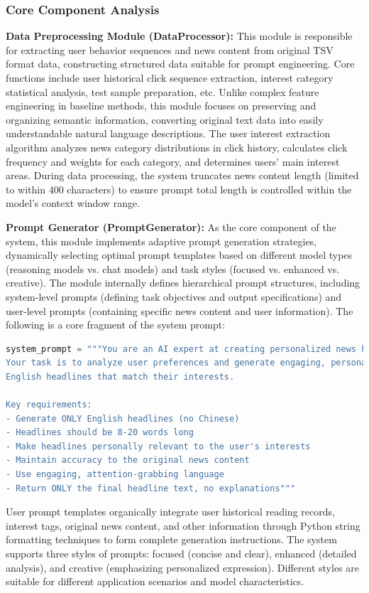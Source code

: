 \documentclass[10pt,a4paper]{article}
\begin{document}
\subsubsection{Core Component Analysis}
\textbf{Data Preprocessing Module (DataProcessor):} This module is responsible for extracting user behavior sequences and news content from original TSV format data, constructing structured data suitable for prompt engineering. Core functions include user historical click sequence extraction, interest category statistical analysis, test sample preparation, etc. Unlike complex feature engineering in baseline methods, this module focuses on preserving and organizing semantic information, converting original text data into easily understandable natural language descriptions. The user interest extraction algorithm analyzes news category distributions in click history, calculates click frequency and weights for each category, and determines users' main interest areas. During data processing, the system truncates news content length (limited to within 400 characters) to ensure prompt total length is controlled within the model's context window range.

\textbf{Prompt Generator (PromptGenerator):} As the core component of the system, this module implements adaptive prompt generation strategies, dynamically selecting optimal prompt templates based on different model types (reasoning models vs. chat models) and task styles (focused vs. enhanced vs. creative). The module internally defines hierarchical prompt structures, including system-level prompts (defining task objectives and output specifications) and user-level prompts (containing specific news content and user information). The following is a core fragment of the system prompt:

\begin{lstlisting}[language=Python, caption=System Prompt Example]
system_prompt = """You are an AI expert at creating personalized news headlines. 
Your task is to analyze user preferences and generate engaging, personalized 
English headlines that match their interests.

Key requirements:
- Generate ONLY English headlines (no Chinese)
- Headlines should be 8-20 words long
- Make headlines personally relevant to the user's interests
- Maintain accuracy to the original news content
- Use engaging, attention-grabbing language
- Return ONLY the final headline text, no explanations"""
\end{lstlisting}

User prompt templates organically integrate user historical reading records, interest tags, original news content, and other information through Python string formatting techniques to form complete generation instructions. The system supports three styles of prompts: focused (concise and clear), enhanced (detailed analysis), and creative (emphasizing personalized expression). Different styles are suitable for different application scenarios and model characteristics.
\end{document}
